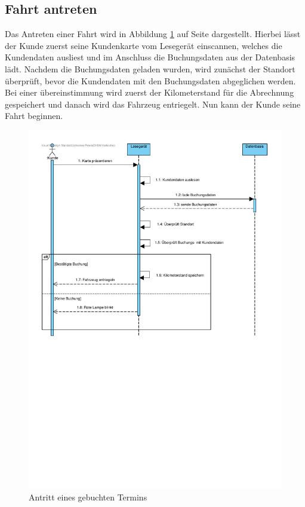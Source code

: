 \clearpage

\subsection{Fahrt antreten}

Das Antreten einer Fahrt wird in Abbildung \ref{img:buchung02} auf Seite \pageref{img:buchung02} dargestellt. Hierbei lässt der Kunde zuerst seine Kundenkarte vom Lesegerät einscannen, welches die Kundendaten ausliest und im Anschluss die Buchungsdaten aus der Datenbasis lädt. Nachdem die Buchungsdaten geladen wurden, wird zunächst der Standort überprüft, bevor die Kundendaten mit den Buchungsdaten abgeglichen werden. Bei einer übereinstimmung wird zuerst der Kilometerstand für die Abrechnung gespeichert und danach wird das Fahrzeug entriegelt. Nun kann der Kunde seine Fahrt beginnen. 


\begin{figure}[!ht]
    \centering
    \includegraphics[width=\textwidth, trim = 0cm 13cm 0cm 0cm]{Bilder/Diagramme/SD_Buchungsvorgang_02.pdf}
    \caption{Antritt eines gebuchten Termins}
    \label{img:buchung02}
\end{figure}

